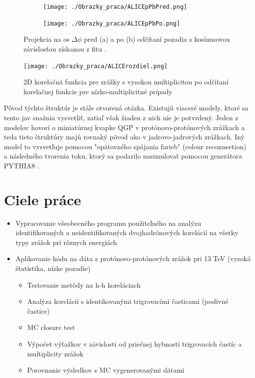 \documentclass[thesismargins, thesislinespacing]{rnthesis}
\begin{document}
\begin{figure}[hbtp!]
	\centering
	\begin{subfigure}{0.5\textwidth}
		\centering
		\texttt{[image: ./Obrazky\_praca/ALICEpPbPred.png]}
		\caption{}
		\label{ALICEpPBPhiPred}
	\end{subfigure}%
	\begin{subfigure}{0.5\textwidth}
		\centering
		\texttt{[image: ./Obrazky\_praca/ALICEpPbPo.png]}
		\caption{}
		\label{ALICEpPBPhiPo}
	\end{subfigure}
	\caption{Projekcia na os $\Delta \phi$ pred (a) a po (b) odčítaní pozadia s kosínusovou závislosťou získanou z fitu \cite{AlicepPb}.}
\end{figure}

\begin{figure}[hbtp!]
	\centering
	\texttt{[image: ./Obrazky\_praca/ALICErozdiel.png]}
	
	\caption{2D korelačná funkcia pre zrážky s vysokou multiplicitou po odčítaní korelačnej funkcie pre nízko-multiplicitné prípady \cite{AlicepPb}}
	\label{ALICErozdiel}
\end{figure}
Pôvod týchto štruktúr je stále otvorená otázka. Existujú viaceré modely, ktoré sa tento jav snažnia vysvetliť, zatiaľ však žiaden z nich nie je potvrdený. Jeden z modelov hovorí o miniatúrnej kvapke QGP v protónovo-protónových zrážkach a teda tieto štruktúry majú rovnaký pôvod ako v jadrovo-jadrových zrážkach. Iný model to vysvetľuje pomocou "\-opätovného spájania farieb" (colour reconnection) a  následného tvorenia toku, ktorý sa podarilo nasimulovať pomocou generátora PYTHIA8 \cite{flowPP}.

\chapter{Ciele práce} 
\begin{itemize}
	\item Vypracovanie všeobecného programu použiteľného na analýzu identifikovaných a neidentifikovaných dvojhadrónových korelácií na všetky typy zrážok pri rôznych energiách
	\item Aplikovanie kódu na dáta z protónovo-protónových zrážok pri 13 TeV (vysoká štatistika, nízke pozadie)
	\begin{itemize}
		\item Testovanie metódy na h-h koreláciach
		\item Analýza korelácií s identikovanými trigrovacími časticami (podivné častice)
		\item MC closure test
		\item Výpočet výťažkov v závislosti od priečnej hybnosti trigrovacích častíc a multiplicity zrážok
		\item Porovnanie výsledkov s MC vygenerovanými dátami 
	\end{itemize}
\end{itemize}
\end{document}

